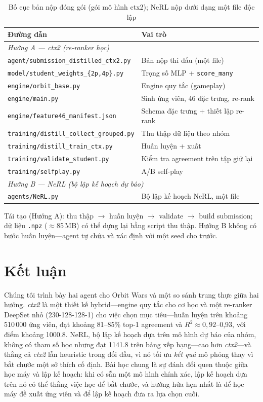 \documentclass[conference]{IEEEtran}
\begin{document}
\begin{table}[htbp]
\caption{Bố cục bản nộp đóng gói (gói mô hình ctx2); NeRL nộp dưới dạng một file độc lập}
\label{tab:files}
\centering
\small
\begin{tabular}{lp{5.4cm}}
\toprule
\textbf{Đường dẫn} & \textbf{Vai trò} \\
\midrule
\multicolumn{2}{l}{\textit{Hướng A --- ctx2 (re-ranker học)}} \\
\texttt{agent/submission\_distilled\_ctx2.py} & Bản nộp thi đấu (một file) \\
\texttt{model/student\_weights\_\{2p,4p\}.py} & Trọng số MLP + \texttt{score\_many} \\
\texttt{engine/orbit\_base.py} & Engine quy tắc (gameplay) \\
\texttt{engine/main.py} & Sinh ứng viên, 46 đặc trưng, re-rank \\
\texttt{engine/feature46\_manifest.json} & Schema đặc trưng + thiết lập re-rank \\
\texttt{training/distill\_collect\_grouped.py} & Thu thập dữ liệu theo nhóm \\
\texttt{training/distill\_train\_ctx.py} & Huấn luyện + xuất \\
\texttt{training/validate\_student.py} & Kiểm tra agreement trên tập giữ lại \\
\texttt{training/selfplay.py} & A/B self-play \\
\midrule
\multicolumn{2}{l}{\textit{Hướng B --- NeRL (bộ lập kế hoạch dự báo)}} \\
\texttt{agents/NeRL.py} & Bộ lập kế hoạch NeRL, một file \\
\bottomrule
\end{tabular}
\end{table}

Tái tạo (Hướng A): thu thập $\rightarrow$ huấn luyện $\rightarrow$ validate $\rightarrow$ build submission; dữ liệu \texttt{.npz} ($\approx$85\,MB) có thể dựng lại bằng script thu thập. Hướng B không có bước huấn luyện---agent tự chứa và xác định với một seed cho trước.

\section{Kết luận}

Chúng tôi trình bày hai agent cho Orbit Wars và một so sánh trung thực giữa hai hướng. \textit{ctx2} là một thiết kế hybrid---engine quy tắc cho cơ học và một re-ranker DeepSet nhỏ (230-128-128-1) cho việc chọn mục tiêu---huấn luyện trên khoảng 510\,000 ứng viên, đạt khoảng 81--85\% top-1 agreement và $R^2 \approx 0{,}92$--0{,}93, với điểm khoảng 1000.8. NeRL, bộ lập kế hoạch dựa trên mô hình dự báo của nhóm, không có tham số học nhưng đạt 1141.8 trên bảng xếp hạng---cao hơn \textit{ctx2}---và thắng cả \textit{ctx2} lẫn heuristic trong đối đầu, vì nó tối ưu \emph{kết quả} mô phỏng thay vì bắt chước một sở thích cố định. Bài học chung là sự đánh đổi quen thuộc giữa học máy và lập kế hoạch: khi có sẵn một mô hình chính xác, lập kế hoạch dựa trên nó có thể thắng việc học để bắt chước, và hướng hứa hẹn nhất là để học máy đề xuất ứng viên và để lập kế hoạch đưa ra lựa chọn cuối.
\end{document}
